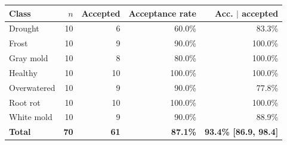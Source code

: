 \begin{tabular}{lrrrr}
\toprule
Class & $n$ & Accepted & Acceptance rate & Acc. $\mid$ accepted \\
\midrule
Drought & 10 & 6 & 60.0\% & 83.3\% \\
Frost & 10 & 9 & 90.0\% & 100.0\% \\
Gray mold & 10 & 8 & 80.0\% & 100.0\% \\
Healthy & 10 & 10 & 100.0\% & 100.0\% \\
Overwatered & 10 & 9 & 90.0\% & 77.8\% \\
Root rot & 10 & 10 & 100.0\% & 100.0\% \\
White mold & 10 & 9 & 90.0\% & 88.9\% \\
\textbf{Total} & \textbf{70} & \textbf{61} & \textbf{87.1\%} & \textbf{93.4\% [86.9, 98.4]} \\
\bottomrule
\end{tabular}
